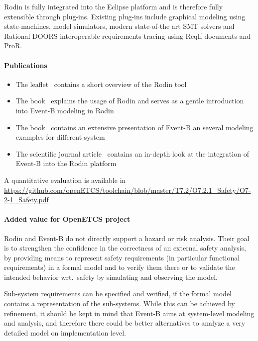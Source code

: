 Rodin is fully integrated into the Eclipse platform and is therefore fully
extensible through plug-ins. Existing plug-ins include graphical modeling using
state-machines, model simulators, modern state-of-the art SMT solvers and
Rational DOORS interoperable requirements tracing using ReqIf documents and
ProR.

\paragraph{Publications}

\begin{itemize}
\item The leaflet~\cite{RodinLeaflet} contains a short overview of the Rodin
  tool
\item The book~\cite{RodinHandbook} explains the usage of Rodin and serves as a
  gentle introduction into Event-B modeling in Rodin
\item The book~\cite{Abrial:2010:MES:1855020} contains an extensive presentation
  of Event-B an several modeling examples for different system
\item The scientific journal article~\cite{AbrialBHHMV10} contains an in-depth
  look at the integration of Event-B into the Rodin platform
\end{itemize}



A quantitative evaluation is available in \url{https://github.com/openETCS/toolchain/blob/master/T7.2/O7.2.1_Safety/O7-2-1_Safety.pdf}

\paragraph{Added value for OpenETCS project}

  Rodin and Event-B do not directly support a hazard or risk analysis. Their
  goal is to strengthen the confidence in the correctness of an external safety
  analysis, by providing means to represent safety requirements (in particular
  functional requirements) in a formal model and to verify them there or to
  validate the intended behavior wrt.\ safety by simulating and observing the
  model.

  Sub-system requirements can be specified and verified, if the formal model
  contains a representation of the sub-systems. While this can be achieved by
  refinement, it should be kept in mind that Event-B aims at system-level
  modeling and analysis, and therefore there could be better alternatives to
  analyze a very detailed model on implementation level.

